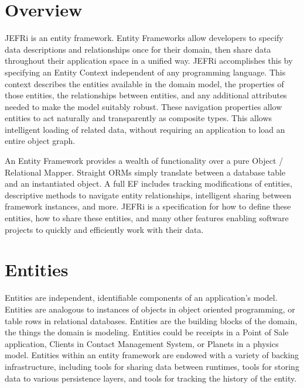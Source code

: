 \documentclass{article}
\renewcommand{\|}{\textbar}
\begin{document}

\tableofcontents
\newpage
\linespread{1.6}

\section{Overview}

JEFRi is an entity framework. Entity Frameworks allow developers to specify data
descriptions and relationships once for their domain, then share data throughout
their application space in a unified way. JEFRi accomplishes this by specifying
an Entity Context independent of any programming language. This context
describes the entities available in the domain model, the properties of those
entities, the relationships between entities, and any additional attributes
needed to make the model suitably robust. These navigation properties allow
entities to act naturally and transparently as composite types. This allows
intelligent loading of related data, without requiring an application to load an
entire object graph.

An Entity Framework provides a wealth of functionality over a pure Object /
Relational Mapper. Straight ORMs simply translate between a database table and
an instantiated object. A full EF includes tracking modifications of entities,
descriptive methods to navigate entity relationships, intelligent sharing
between framework instances, and more. JEFRi is a specification for how to
define these entities, how to share these entities, and many other features
enabling software projects to quickly and efficiently work with their data.

\section{Entities}

Entities are independent, identifiable components of an application's model.
Entities are analogous to instances of objects in object oriented programming,
or table rows in relational databases. Entities are the building blocks of the
domain, the things the domain is modeling. Entities could be receipts in a Point
of Sale application, Clients in Contact Management System, or Planets in a
physics model. Entities within an entity framework are endowed with a variety of
backing infrastructure, including tools for sharing data between runtimes, tools
for storing data to various persistence layers, and tools for tracking the
history of the entity.
\end{document}
